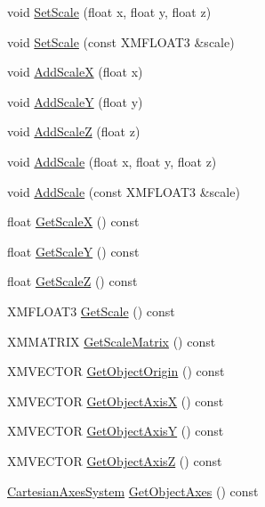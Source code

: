 \begin{DoxyCompactItemize}
\item 
void \hyperlink{structmage_1_1_transform_a6c7e193f6bfddb8c7af5c35b538cdee5}{Set\+Scale} (float x, float y, float z)
\item 
void \hyperlink{structmage_1_1_transform_a72e4788366a1638a80fd124e344d0d33}{Set\+Scale} (const X\+M\+F\+L\+O\+A\+T3 \&scale)
\item 
void \hyperlink{structmage_1_1_transform_afb49f4e4ca1772f8ed38465afcf414a0}{Add\+ScaleX} (float x)
\item 
void \hyperlink{structmage_1_1_transform_ae3213b5cc2b347236783389c1b717356}{Add\+ScaleY} (float y)
\item 
void \hyperlink{structmage_1_1_transform_aa493f3a588376d094ce50dfcffe0ece2}{Add\+ScaleZ} (float z)
\item 
void \hyperlink{structmage_1_1_transform_a10681b78ac7980fa3aa6c6c11a274f99}{Add\+Scale} (float x, float y, float z)
\item 
void \hyperlink{structmage_1_1_transform_a7f5092b95426c47a55bd3dff16cea31e}{Add\+Scale} (const X\+M\+F\+L\+O\+A\+T3 \&scale)
\item 
float \hyperlink{structmage_1_1_transform_a3a82465d40dde6b98ca274a8de061545}{Get\+ScaleX} () const
\item 
float \hyperlink{structmage_1_1_transform_acbd677fa7e27cb15d205ac8354d8624a}{Get\+ScaleY} () const
\item 
float \hyperlink{structmage_1_1_transform_a9e8f3a4ec330e6f4c9e1a9607daf30fa}{Get\+ScaleZ} () const
\item 
X\+M\+F\+L\+O\+A\+T3 \hyperlink{structmage_1_1_transform_a38234d822ee1ffbbcfb2601a1d5f8475}{Get\+Scale} () const
\item 
X\+M\+M\+A\+T\+R\+IX \hyperlink{structmage_1_1_transform_ab78050be41abf1ab36d969d5235f97e2}{Get\+Scale\+Matrix} () const
\item 
X\+M\+V\+E\+C\+T\+OR \hyperlink{structmage_1_1_transform_a2f7cfedf5c67115cb6c29aac07c71d07}{Get\+Object\+Origin} () const
\item 
X\+M\+V\+E\+C\+T\+OR \hyperlink{structmage_1_1_transform_a1817e9ff4397b5a107541b92a01b91fc}{Get\+Object\+AxisX} () const
\item 
X\+M\+V\+E\+C\+T\+OR \hyperlink{structmage_1_1_transform_a1d2b560af18a18246186cdb8477e9019}{Get\+Object\+AxisY} () const
\item 
X\+M\+V\+E\+C\+T\+OR \hyperlink{structmage_1_1_transform_af6bf20352279957fdba5041074bdf9c2}{Get\+Object\+AxisZ} () const
\item 
\hyperlink{structmage_1_1_cartesian_axes_system}{Cartesian\+Axes\+System} \hyperlink{structmage_1_1_transform_a814f749d70104ec5732a741b0b2b7220}{Get\+Object\+Axes} () const

\end{DoxyCompactItemize}
